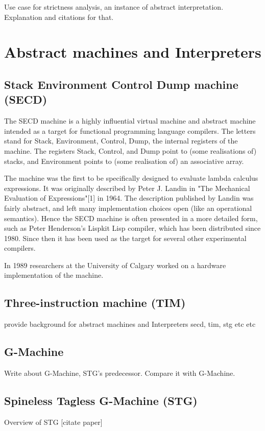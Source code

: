 \documentclass[diploma]{softlab-thesis}
\begin{document}
Use case for strictness analysis, an instance of 
abstract interpretation. Explanation and citations
for that.

\section{Abstract machines and Interpreters}

\subsection {Stack Environment Control Dump machine (SECD)}

The SECD machine is a highly influential 
virtual machine and abstract 
machine intended as a target for functional programming 
language compilers. The letters stand for Stack, Environment, 
Control, Dump, the internal registers of the machine. 
The registers Stack, Control, and Dump point to (some 
realisations of) stacks, and Environment points to (some 
realisation of) an associative array.

The machine was the first to be specifically designed to 
evaluate lambda calculus expressions. It was originally 
described by Peter J. Landin in "The Mechanical Evaluation 
of Expressions"[1] in 1964. The description published by 
Landin was fairly abstract, and left many implementation 
choices open (like an operational semantics). Hence the SECD 
machine is often presented in a more detailed form, such as 
Peter Henderson's Lispkit Lisp compiler, which has been 
distributed since 1980. Since then it has been used as the 
target for several other experimental compilers.

In 1989 researchers at the University of Calgary worked 
on a hardware implementation of the machine.

\subsection{Three-instruction machine (TIM)}

provide background for abstract machines and Interpreters
secd, tim, stg etc etc

\subsection{G-Machine}
Write about G-Machine, STG's predecessor. Compare it with G-Machine.

\subsection{Spineless Tagless G-Machine (STG)}
Overview of STG [citate paper]
\end{document}
